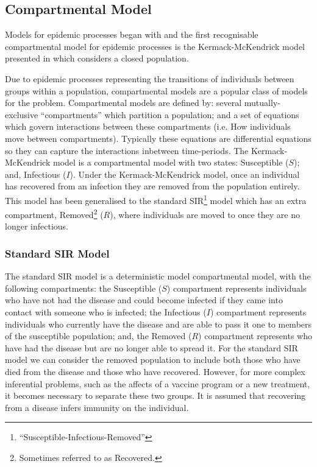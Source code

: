 \documentclass[11pt,a4paper]{article}
\theoremstyle{break}
\begin{document}
\subsection{Compartmental Model}\label{sec_compartmental_models}

  \par Models for epidemic processes began with \cite[]{application_of_the_theory_of_probabilities_to_the_study_of_a_prior_pathometry_part_i,application_of_the_theory_of_probabilities_to_the_study_of_a_prior_pathometry_part_ii} and the first recognisable compartmental model for epidemic processes is the Kermack-McKendrick model presented in \cite[]{contribution_to_the_mathematical_theory_of_epidemics} which considers a closed population.

  \par Due to epidemic processes representing the transitions of individuals between groups within a population, compartmental models are a popular class of models for the problem. Compartmental models are defined by: several mutually-exclusive ``compartments'' which partition a population; and a set of equations which govern interactions between these compartments (i.e. How individuals move between compartments). Typically these equations are differential equations so they can capture the interactions inbetween time-periods. The Kermack-McKendrick model is a compartmental model with two states: Susceptible ($S$); and, Infectious ($I$). Under the Kermack-McKendrick model, once an individual has recovered from an infection they are removed from the population entirely. This model has been generalised to the standard SIR\footnote{``Susceptible-Infectious-Removed''} model which has an extra compartment, Removed\footnote{Sometimes referred to as Recovered.} ($R$), where individuals are moved to once they are no longer infectious.

\subsubsection{Standard SIR Model}\label{sec_standard_sir_model}

  \par The standard SIR model \cite[]{mathematical_modelling_and_prediction_in_infectious_disease_epidemiology} is a deterministic model compartmental model, with the following compartments: the Susceptible ($S$) compartment represents individuals who have not had the disease and could become infected if they came into contact with someone who is infected; the Infectious ($I$) compartment represents individuals who currently have the disease and are able to pass it one to members of the susceptible population; and, the Removed ($R$) compartment represents who have had the disease but are no longer able to spread it. For the standard SIR model we can consider the removed population to include both those who have died from the disease and those who have recovered. However, for more complex inferential problems, such as the affects of a vaccine program or a new treatment, it becomes necessary to separate these two groups. It is assumed that recovering from a disease infers immunity on the individual.
\end{document}
